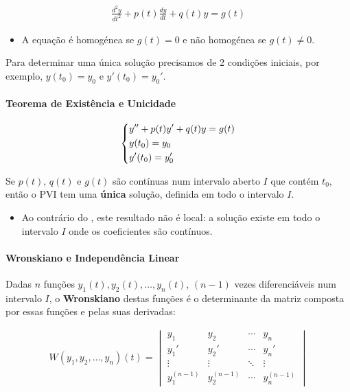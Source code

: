 \documentclass{article}
\begin{document}
\begin{gather*}
\boxed{\frac{d^2y}{dt^2} + p(t)\frac{dy}{dt} + q(t)y = g(t)}
\end{gather*}

\begin{itemize}
    \item A equação é homogénea se $g(t) = 0$ e não homogénea se $g(t) \neq 0$.
\end{itemize}

Para determinar uma única solução precisamos de 2 condições iniciais, por exemplo,
$y(t_0) = y_0$ e $y'(t_0) = y_0'$.

\paragraph{Teorema de Existência e Unicidade}

\begin{gather*}
\begin{dcases}
y'' + p(t)y' + q(t)y = g(t) \\
y(t_0) = y_0 \\
y'(t_0) = y_0'
\end{dcases}
\end{gather*}

Se $p(t)$, $q(t)$ e $g(t)$ são contínuas num intervalo aberto $I$ que contém $t_0$, então o PVI tem
uma \textbf{única} solução, definida em todo o intervalo $I$.

\begin{itemize}
    \item Ao contrário do , este resultado não é
    local: a solução existe em todo o intervalo $I$ onde os coeficientes são contínuos.
\end{itemize}

\paragraph{Wronskiano e Independência Linear}

Dadas $n$ funções $y_1(t), y_2(t), \ldots, y_n(t)$, $(n-1)$ vezes diferenciáveis num intervalo $I$,
o \textbf{Wronskiano} destas funções é o determinante da matriz composta por essas funções e
pelas suas derivadas:

\begin{gather*}
W(y_1, y_2, \ldots, y_n)(t) =
\begin{vmatrix}
y_1 & y_2 & \cdots & y_n \\
y_1' & y_2' & \cdots & y_n' \\
\vdots & \vdots & \ddots & \vdots \\
y_1^{(n-1)} & y_2^{(n-1)} & \cdots & y_n^{(n-1)}
\end{vmatrix}
\end{gather*}
\end{document}
